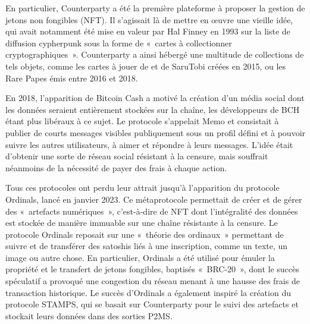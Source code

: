 En particulier, Counterparty a été la première plateforme à proposer la gestion de jetons non fongibles (NFT). Il s'agissait là de mettre en œuvre une vieille idée, qui avait notamment été mise en valeur par Hal Finney en 1993 sur la liste de diffusion cypherpunk sous la forme de «~cartes à collectionner cryptographiques~». Counterparty a ainsi hébergé une multitude de collections de tels objets, comme les cartes à jouer de  et de SaruTobi créées en 2015, ou les Rare Papes émis entre 2016 et 2018.

En 2018, l'apparition de Bitcoin Cash a motivé la création d'un média social dont les données seraient entièrement stockées sur la chaîne, les développeurs de BCH étant plus libéraux à ce sujet. Le protocole s'appelait Memo et consistait à publier de courts messages visibles publiquement sous un profil défini et à pouvoir suivre les autres utilisateurs, à aimer et répondre à leurs messages. L'idée était d'obtenir une sorte de réseau social résistant à la censure, mais souffrait néanmoins de la nécessité de payer des frais à chaque action. 

Tous ces protocoles ont perdu leur attrait jusqu'à l'apparition du protocole Ordinals, lancé en janvier 2023. Ce métaprotocole permettait de créer et de gérer des «~artefacts numériques~», c'est-à-dire de NFT dont l'intégralité des données est stockée de manière immuable sur une chaîne résistante à la censure. Le protocole Ordinals reposait sur une «~théorie des ordinaux~» permettant de suivre et de transférer des satoshis liés à une inscription, comme un texte, un image ou autre chose. En particulier, Ordinals a été utilisé pour émuler la propriété et le transfert de jetons fongibles, baptisés «~BRC-20~», dont le succès spéculatif a provoqué une congestion du réseau menant à une hausse des frais de transaction historique. Le succès d'Ordinals a également inspiré la création du protocole STAMPS, qui se basait sur Counterparty pour le suivi des artefacts et stockait leurs données dans des sorties P2MS.

